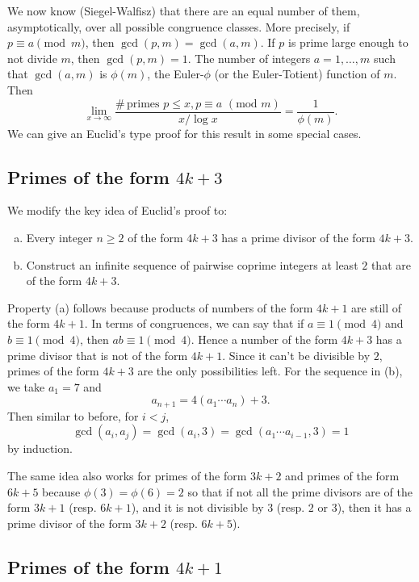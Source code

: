 \documentclass{article}
\begin{document}
We now know (Siegel-Walfisz) that there are an equal number of them, asymptotically, over all possible congruence classes. More precisely, if $p\equiv a\pmod{m}$, then $\gcd(p,m) = \gcd(a,m)$. If $p$ is prime large enough to not divide $m$, then $\gcd(p,m) = 1$. The number of integers $a = 1,\ldots,m$ such that $\gcd(a,m)$ is $\phi(m)$, the Euler-$\phi$ (or the Euler-Totient) function of $m$. Then 
$$\lim_{x\rightarrow\infty}\frac{\#\,\text{primes }p\leq x,p\equiv a \,\,(\text{mod }m)}{x/\log x} = \frac{1}{\phi(m)}.$$
We can give an Euclid's type proof for this result in some special cases.

\subsection*{Primes of the form $4k+3$} 

We modify the key idea of Euclid's proof to:
\begin{enumerate}[(a)]
    \item Every integer $n\geq2$ of the form $4k+3$ has a prime divisor of the form $4k+3$.
    \item Construct an infinite sequence of pairwise coprime integers at least $2$ that are of the form $4k+3$.
\end{enumerate}
Property (a) follows because products of numbers of the form $4k+1$ are still of the form $4k+1$. In terms of congruences, we can say that if $a\equiv 1\pmod{4}$ and $b\equiv 1\pmod{4}$, then $ab\equiv 1\pmod{4}$. Hence a number of the form $4k+3$ has a prime divisor that is not of the form $4k+1$. Since it can't be divisible by $2$, primes of the form $4k+3$ are the only possibilities left. For the sequence in (b), we take $a_1 = 7$ and $$a_{n+1} = 4(a_1\cdots a_n) + 3.$$
Then similar to before, for $i<j$, $$\gcd(a_i,a_j) = \gcd(a_i,3) = \gcd(a_1\cdots a_{i-1},3) = 1$$
by induction.

\vspace{5pt}
The same idea also works for primes of the form $3k+2$ and primes of the form $6k+5$ because $\phi(3) = \phi(6) = 2$ so that if not all the prime divisors are of the form $3k+1$ (resp. $6k+1$), and it is not divisible by $3$ (resp. $2$ or $3$), then it has a prime divisor of the form $3k+2$ (resp. $6k+5$).

\subsection*{Primes of the form $4k+1$}
\end{document}
